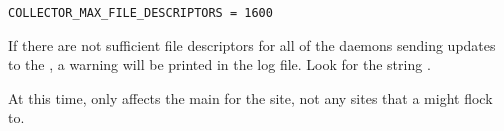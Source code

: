 \begin{verbatim}
COLLECTOR_MAX_FILE_DESCRIPTORS = 1600
\end{verbatim}

If there are not sufficient file descriptors for all of the daemons
sending updates to the , a warning will be printed in the
 log file.  Look for the string
.

\Note At this time,  only
affects the main  for the site, not any sites that
a  might flock to.

